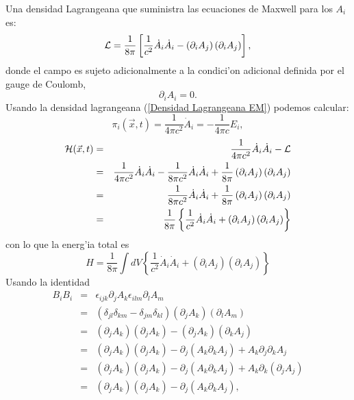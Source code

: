 Una densidad Lagrangeana que suministra las ecuaciones de Maxwell para los
$A_{i}$ es:%
\begin{equation}
{\cal L}=\frac{1}{8\pi}\left[ \frac{1}{c^{2}}\dot{A}_{i}\dot{A}_{i}-\left(
\partial_{i}A_{j}\right) \left(
\partial_{i}A_{j}\right)\right] , \label{Densidad Lagrangeana EM}
\end{equation}
donde el campo es sujeto adicionalmente a la condici'on adicional definida por
el gauge de Coulomb,
\begin{equation}
\partial_{i}A_{i}=0.
\end{equation} 
Usando la densidad lagrangeana (\ref{Densidad Lagrangeana EM}) podemos calcular:
\begin{equation}
\pi_{i}(\vec{x},t) = \frac{1}{4\pi c^{2}}\dot{A}_{i}=-\frac{1}{4\pi c}E_{i}
\label{DensidadMomentoCanonicoConjugado EM},
\end{equation}
\begin{eqnarray}
{\cal H}(\vec{x},t)& = &\frac{1}{4\pi c^{2}}\dot{A}_{i}\dot{A}_{i}-{\cal L}
\nonumber\\
& = &\frac{1}{4\pi c^{2}}\dot{A}_{i}\dot{A}_{i}-\frac{1}{8\pi c^{2}}\dot
{A}_{i}\dot{A}_{i}+\frac{1}{8\pi}\left( \partial_{i}A_{j}\right) \left(
\partial_{i}A_{j}\right) \nonumber\\
& = &\frac{1}{8\pi c^{2}}\dot{A}_{i}\dot{A}_{i}+\frac{1}{8\pi}\left(
\partial_{i}A_{j}\right) \left( \partial_{i}A_{j}\right) \nonumber\\
& = &\frac{1}{8\pi}\left\{ \frac{1}{c^{2}}\dot{A}_{i}\dot{A}_{i}+\left(
\partial_{i}A_{j}\right) \left( \partial_{i}A_{j}\right) \right\}
\label{Densidad Hamiltoniana EM}%
\end{eqnarray}
con lo que la energ'ia total es
\begin{equation}
H =\frac{1}{8\pi}\int dV \left\{ \frac{1}%
{c^{2}}\dot{A}_{i}\dot{A}_{i}+\left( \partial_{i}A_{j}\right) \left(
\partial_{i}A_{j}\right) \right\} \label{Energia del Campo EM1}%
\end{equation}
Usando la identidad
\begin{eqnarray}
B_{i}B_{i} & = &\epsilon_{ijk}\partial_{j}A_{k}\epsilon_{ilm}\partial_{l}%
A_{m}\\
& = &\left( \delta_{jl}\delta_{km}-\delta_{jm}\delta_{kl}\right) \left(
\partial_{j}A_{k}\right) \left( \partial_{l}A_{m}\right) \\
& = &\left( \partial_{j}A_{k}\right) \left( \partial_{j}A_{k}\right)
-\left( \partial_{j}A_{k}\right) \left( \partial_{k}A_{j}\right) \\
& = &\left( \partial_{j}A_{k}\right) \left( \partial_{j}A_{k}\right)
-\partial_{j}\left( A_{k}\partial_{k}A_{j}\right) +A_{k}\partial_{j}%
\partial_{k}A_{j}\\
& = &\left( \partial_{j}A_{k}\right) \left( \partial_{j}A_{k}\right)
-\partial_{j}\left( A_{k}\partial_{k}A_{j}\right)
+A_{k}\partial_{k}(\partial_{j}A_{j})\\
& = &\left( \partial_{j}A_{k}\right) \left( \partial_{j}A_{k}\right)
-\partial_{j}\left( A_{k}\partial_{k}A_{j}\right),
\end{eqnarray}
